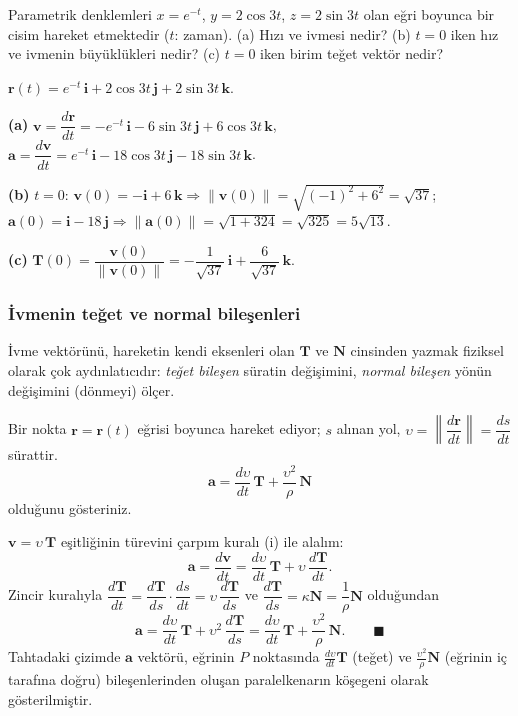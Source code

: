 \begin{soru}
Parametrik denklemleri $x=e^{-t}$, $y=2\cos3t$, $z=2\sin3t$ olan eğri boyunca bir cisim hareket etmektedir ($t$: zaman).
(a) Hızı ve ivmesi nedir? (b) $t=0$ iken hız ve ivmenin büyüklükleri nedir? (c) $t=0$ iken birim teğet vektör nedir?
\end{soru}
\begin{cevap}
$\mathbf r(t)=e^{-t}\,\mathbf i+2\cos3t\,\mathbf j+2\sin3t\,\mathbf k$.

\textbf{(a)} $\mathbf v=\dfrac{d\mathbf r}{dt}=-e^{-t}\,\mathbf i-6\sin3t\,\mathbf j+6\cos3t\,\mathbf k$, \quad
$\mathbf a=\dfrac{d\mathbf v}{dt}=e^{-t}\,\mathbf i-18\cos3t\,\mathbf j-18\sin3t\,\mathbf k$.

\textbf{(b)} $t=0$: $\mathbf v(0)=-\mathbf i+6\,\mathbf k\Rightarrow\|\mathbf v(0)\|=\sqrt{(-1)^2+6^2}=\sqrt{37}$;
\ $\mathbf a(0)=\mathbf i-18\,\mathbf j\Rightarrow\|\mathbf a(0)\|=\sqrt{1+324}=\sqrt{325}=5\sqrt{13}$.

\textbf{(c)} $\mathbf T(0)=\dfrac{\mathbf v(0)}{\|\mathbf v(0)\|}=-\dfrac1{\sqrt{37}}\,\mathbf i+\dfrac6{\sqrt{37}}\,\mathbf k$.
\end{cevap}

\subsubsection{İvmenin teğet ve normal bileşenleri}

İvme vektörünü, hareketin kendi eksenleri olan $\mathbf T$ ve $\mathbf N$ cinsinden yazmak fiziksel olarak çok aydınlatıcıdır:
\emph{teğet bileşen} süratin değişimini, \emph{normal bileşen} yönün değişimini (dönmeyi) ölçer.

\begin{soru}
Bir nokta $\mathbf r=\mathbf r(t)$ eğrisi boyunca hareket ediyor; $s$ alınan yol, $\upsilon=\left\|\dfrac{d\mathbf r}{dt}\right\|=\dfrac{ds}{dt}$ sürattir.
\[ \mathbf a=\frac{d\upsilon}{dt}\,\mathbf T+\frac{\upsilon^2}{\rho}\,\mathbf N \]
olduğunu gösteriniz.
\end{soru}
\begin{cevap}
$\mathbf v=\upsilon\,\mathbf T$ eşitliğinin türevini çarpım kuralı (i) ile alalım:
\[ \mathbf a=\frac{d\mathbf v}{dt}=\frac{d\upsilon}{dt}\,\mathbf T+\upsilon\,\frac{d\mathbf T}{dt} . \]
Zincir kuralıyla $\dfrac{d\mathbf T}{dt}=\dfrac{d\mathbf T}{ds}\cdot\dfrac{ds}{dt}=\upsilon\,\dfrac{d\mathbf T}{ds}$ ve
$\dfrac{d\mathbf T}{ds}=\kappa\mathbf N=\dfrac1\rho\mathbf N$ olduğundan
\[ \mathbf a=\frac{d\upsilon}{dt}\,\mathbf T+\upsilon^2\,\frac{d\mathbf T}{ds}=\frac{d\upsilon}{dt}\,\mathbf T+\frac{\upsilon^2}{\rho}\,\mathbf N . \qquad\blacksquare \]
Tahtadaki çizimde $\mathbf a$ vektörü, eğrinin $P$ noktasında $\frac{d\upsilon}{dt}\mathbf T$ (teğet) ve $\frac{\upsilon^2}{\rho}\mathbf N$
(eğrinin iç tarafına doğru) bileşenlerinden oluşan paralelkenarın köşegeni olarak gösterilmiştir.
\end{cevap}

